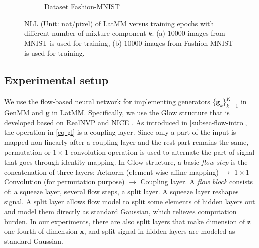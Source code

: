 \begin{figure}[!ht]
\begin{subfigure}{.4\textwidth}
    \vspace{-0.6cm}
    \caption{Dataset Fashion-MNIST}
    \label{fig-latmm-fsh-nll-curve}
  \end{subfigure}
  \vspace{-0.3cm}
  \caption{NLL (Unit: nat/pixel) of LatMM versus training epochs with different number of mixture component $k$. (a) $10000$ images from MNIST is used for training, (b) $10000$ images from Fashion-MNIST is used for training.}
  \label{fig:latmm-nll}
  \vspace{0.3cm}
\end{figure}
\subsection{Experimental setup}\label{sub:exp-setup}



We use the flow-based neural network for implementing generators $\{\bm{g}_k\}_{k=1}^{K}$ in GenMM and $\bm{g}$ in LatMM. Specifically, we use the Glow structure \cite{2018arXiv180703039K} that is developed based on RealNVP \cite{2016arXiv160508803D} and NICE \cite{DBLP:journals/corr/DinhKB14}. As introduced in \autoref{subsec-flow-intro}, the operation in \autoref{eq-gl} is a coupling
layer. Since only a part of the input is mapped non-linearly after a coupling
layer and the rest part remains the same, permutation \cite{2016arXiv160508803D} or $1\times 1$ convolution operation \cite{2018arXiv180703039K} is used to alternate the part of signal that goes through identity mapping. In Glow structure, a basic \textit{flow step} is the concatenation of three layers: Actnorm (element-wise affine mapping)
$\rightarrow$ $1\times 1$ Convolution (for permutation purpose)
$\rightarrow$ Coupling layer. A \textit{flow block} consists of: a squeeze layer,
several flow steps, a split layer. A squeeze layer reshapes
signal. A split layer allows
flow model to split some elements of hidden layers out and model them
directly as standard Gaussian, which relieves computation burden. In our experiments, there are also split layers that make dimension of $\bm{z}$ one fourth of dimension $\bm{x}$, and split signal in hidden layers are modeled as standard Gaussian. 

